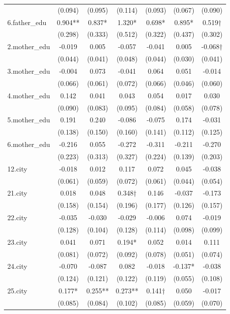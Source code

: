 \documentclass[]{article}
\begin{document}
\begin{tabular}{lcccccc}
 & (0.094) & (0.095) & (0.114) & (0.093) & (0.067) & (0.090) \\
6.father\_edu & 0.904** & 0.837* & 1.320* & 0.698* & 0.895* & 0.519† \\
 & (0.298) & (0.333) & (0.512) & (0.322) & (0.437) & (0.302) \\
2.mother\_edu & -0.019 & 0.005 & -0.057 & -0.041 & 0.005 & -0.068† \\
 & (0.044) & (0.041) & (0.048) & (0.044) & (0.030) & (0.041) \\
3.mother\_edu & -0.004 & 0.073 & -0.041 & 0.064 & 0.051 & -0.014 \\
 & (0.066) & (0.061) & (0.072) & (0.066) & (0.046) & (0.060) \\
4.mother\_edu & 0.142 & 0.041 & 0.043 & 0.054 & 0.017 & 0.030 \\
 & (0.090) & (0.083) & (0.095) & (0.084) & (0.058) & (0.078) \\
5.mother\_edu & 0.191 & 0.240 & -0.086 & -0.075 & 0.174 & -0.031 \\
 & (0.138) & (0.150) & (0.160) & (0.141) & (0.112) & (0.125) \\
6.mother\_edu & -0.216 & 0.055 & -0.272 & -0.311 & -0.211 & -0.270 \\
 & (0.223) & (0.313) & (0.327) & (0.224) & (0.139) & (0.203) \\
12.city & -0.018 & 0.012 & 0.117 & 0.072 & 0.045 & -0.038 \\
 & (0.061) & (0.059) & (0.072) & (0.061) & (0.044) & (0.054) \\
21.city & 0.018 & 0.048 & 0.348† & 0.146 & -0.037 & -0.173 \\
 & (0.158) & (0.154) & (0.196) & (0.177) & (0.126) & (0.157) \\
22.city & -0.035 & -0.030 & -0.029 & -0.006 & 0.074 & -0.019 \\
 & (0.128) & (0.104) & (0.128) & (0.114) & (0.098) & (0.099) \\
23.city & 0.041 & 0.071 & 0.194* & 0.052 & 0.014 & 0.111 \\
 & (0.081) & (0.072) & (0.092) & (0.078) & (0.051) & (0.074) \\
24.city & -0.070 & -0.087 & 0.082 & -0.018 & -0.137* & -0.038 \\
 & (0.124) & (0.121) & (0.122) & (0.119) & (0.055) & (0.108) \\
25.city & 0.177* & 0.255** & 0.273** & 0.141† & 0.050 & -0.017 \\
 & (0.085) & (0.084) & (0.102) & (0.085) & (0.059) & (0.070) \\

\end{tabular}
\end{document}
